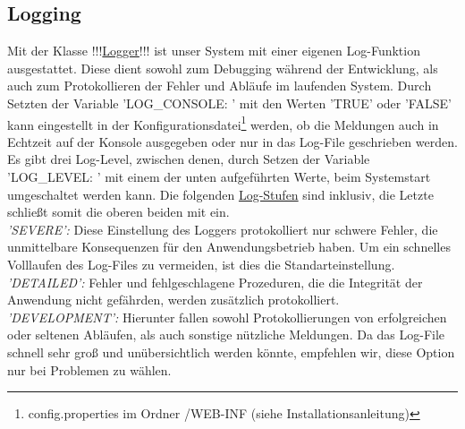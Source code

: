 \documentclass{article}
\begin{document}
\subsection{Logging}
Mit der Klasse !!!\hyperlink{Logger}{Logger}!!! ist unser System mit einer eigenen Log-Funktion ausgestattet. Diese dient sowohl zum Debugging während der Entwicklung, als auch zum Protokollieren der Fehler und Abläufe im laufenden System. Durch Setzten der Variable 'LOG\_CONSOLE: ' mit den Werten 'TRUE' oder 'FALSE' kann eingestellt in der Konfigurationsdatei\footnote{config.properties im Ordner /WEB-INF (siehe Installationsanleitung)} werden, ob die Meldungen auch in Echtzeit auf der Konsole ausgegeben oder nur in das Log-File geschrieben werden. Es gibt drei Log-Level, zwischen denen, durch Setzen der Variable 'LOG\_LEVEL: ' mit einem der unten aufgeführten Werte, beim Systemstart umgeschaltet werden kann. Die folgenden \hyperlink{Enum}{Log-Stufen} sind inklusiv, die Letzte schließt somit die oberen beiden mit ein. \\
\textit{'SEVERE':} Diese Einstellung des Loggers protokolliert nur schwere Fehler, die unmittelbare Konsequenzen für den Anwendungsbetrieb haben. Um ein schnelles Volllaufen des Log-Files zu vermeiden, ist dies die Standarteinstellung.\\
\textit{'DETAILED':} Fehler und fehlgeschlagene Prozeduren, die die Integrität der Anwendung nicht gefährden, werden zusätzlich protokolliert.\\
\textit{'DEVELOPMENT':} Hierunter fallen sowohl Protokollierungen von erfolgreichen oder seltenen Abläufen, als auch sonstige nützliche Meldungen. Da das Log-File schnell sehr groß und unübersichtlich werden könnte, empfehlen wir, diese Option nur bei Problemen zu wählen.\\
\end{document}
